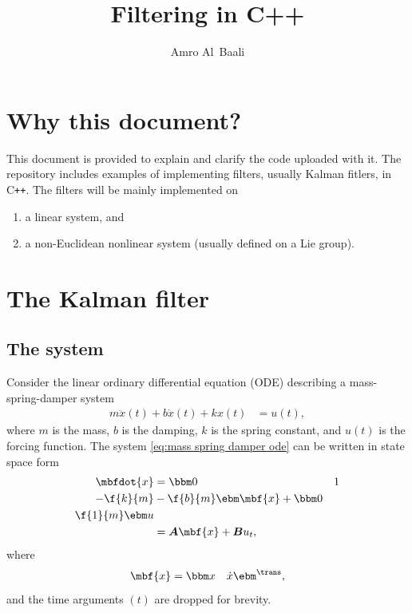 \documentclass[nobib]{tufte-handout}
\title{Filtering in C++}
\author{Amro Al~Baali}
\newcommand{\cpp}{C\texttt{++}}
\begin{document}
    {    
        
        \tableofcontents
        \clearpage
    }

    \section{Why this document?}
    This document is provided to explain and clarify the code uploaded with it. The repository includes examples of implementing filters, usually Kalman fitlers, in \cpp. The filters will be mainly implemented on 
    \begin{enumerate}
        \item a linear system, and
        \item a non-Euclidean nonlinear system (usually defined on a Lie group).
    \end{enumerate}

    \section{The Kalman filter}
    \subsection{The system}
    Consider the linear ordinary differential equation (ODE) describing a mass-spring-damper system
    \begin{align}
        \label{eq:mass spring damper ode}
        m\ddot{x}(t) + b\dot{x}(t) + kx(t) &= u(t),
    \end{align}
    where $m$ is the mass, $b$ is the damping, $k$ is the spring constant, and $u(t)$ is the forcing function. The system \eqref{eq:mass spring damper ode} can be written in state space form
    \begin{align}
        \mbfdot{x} &= \bbm 0 & 1\\ -\f{k}{m} & -\f{b}{m} \ebm \mbf{x} + \bbm 0\\\f{1}{m} \ebm u\\
        &= \boldsymbol{A}\mbf{x} + \boldsymbol{B}u_{t},
    \end{align}
    where 
    \begin{align}
        \label{eq:DT linear kinematic model}
        \mbf{x} &= \bbm x & \dot{x} \ebm^{\trans},
    \end{align}
    and the time arguments $(t)$ are dropped for brevity.
\end{document}
